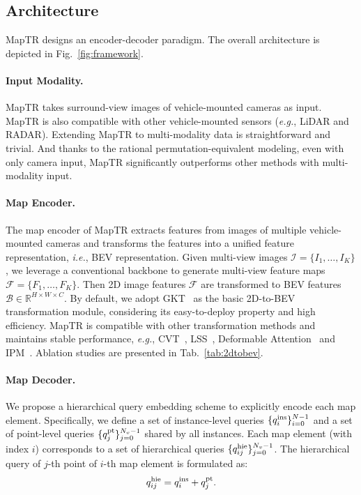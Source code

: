 \documentclass{article} \usepackage{iclr2023_conference,times}
\def\eg{\emph{e.g.}} \def\Eg{\emph{E.g.}}
\def\ie{\emph{i.e.}} \def\Ie{\emph{I.e.}}
\begin{document}
\subsection{Architecture \label{sec:architecture}}
MapTR designs an encoder-decoder paradigm. The overall architecture is depicted in Fig.~\ref{fig:framework}.

\paragraph{Input Modality.}
MapTR takes surround-view images of vehicle-mounted cameras as input.
MapTR is also compatible with other vehicle-mounted sensors (\eg, LiDAR and RADAR).
Extending MapTR to multi-modality data is straightforward and trivial.
And thanks to the rational permutation-equivalent modeling, even with only camera input, MapTR significantly outperforms other methods with multi-modality input.

\paragraph{Map Encoder.}
The map encoder of MapTR extracts features from images of multiple vehicle-mounted cameras and transforms the features into a unified feature representation, \ie, BEV representation.
Given multi-view images $\mathcal{I}=\{I_1, \ldots, I_K\} $,
we leverage a conventional backbone to generate multi-view feature maps $\mathcal{F}=\{F_1, \ldots, F_K\} $.
Then 2D image features $\mathcal{F}$ are transformed to BEV features  $\mathcal{B} \in \mathbb{R}^{H\times W \times C}$.
By default, we adopt GKT~\citep{gkt} as the basic 2D-to-BEV transformation module, considering its easy-to-deploy property and high efficiency. MapTR is compatible with other transformation methods and maintains stable performance, \eg, CVT~\citep{cvt}, LSS~\citep{lss,liu2022bevfusion,bevdepth,bevdet}, Deformable Attention~\citep{bevformer,deformdetr} and IPM~\citep{ipm}. Ablation studies are presented in Tab.~\ref{tab:2dtobev}.

\paragraph{Map Decoder.}
We propose a hierarchical query embedding scheme to explicitly encode each map element. Specifically, we define a set of instance-level queries $\{ q^{\rm{ins}}_i\}_{i=0}^{N-1}$ and a set of point-level queries $\{q^{\rm{pt}}_j\}_{j=0}^{N_v-1}$ shared by all instances. 
Each map element (with index $i$) corresponds to a set of hierarchical queries $\{q^{\rm{hie}}_{ij}\}_{j=0}^{N_v-1}$.
The hierarchical query of $j$-th point of $i$-th map element is formulated as:
\begin{equation}
\begin{gathered}
    q^{\rm{hie}}_{ij} =  q^{\rm{ins}}_i + q^{\rm{pt}}_j.
\end{gathered}
\end{equation}
\end{document}
